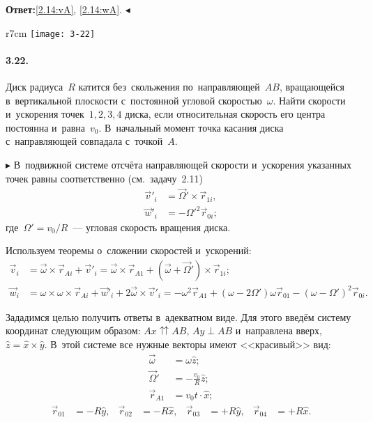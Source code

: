 \documentclass{weekly}
\begin{document}
\textbf{Ответ:}\quad \eqref{2.14:vA}, \eqref{2.14:wA}.
\hfill $\blacktriangleleft$


\begin{wrapfigure}[6]{r}{7cm}\vspace{-5.5mm}
    \texttt{[image: 3-22]}
\end{wrapfigure}
\paragraph{3.22.} Диск радиуса~$R$ катится без~скольжения
по~направляющей~$AB$, вращающейся в~вертикальной плоскости
с~постоянной угловой скоростью~$\omega$. Найти скорости
и~ускорения точек~$1, 2, 3, 4$ диска, если относительная
скорость его центра постоянна и~равна~$v_0$.
В~начальный момент точка касания диска с~направляющей
совпадала с~точкой~$A$.

$\blacktriangleright$ В~подвижной системе отсчёта направляющей
скорости и~ускорения указанных точек
равны соответственно (см.~задачу~2.11)
\begin{align}
    \vec v'_i &= \vec\Omega' \times \vec r_{1i}, \\
    \vec w'_i &= -\Omega'^2 \vec r_{0i};
\end{align}
где~$\Omega' = v_0/R$~--- угловая скорость вращения диска.

Используем теоремы о~сложении скоростей и~ускорений:
\begin{align}
    \vec v_i &= \vec\omega \times \vec r_{Ai} + \vec v'_i
        = \vec\omega \times \vec r_{A1} +
            \left(\vec\omega + \vec\Omega'\right) \times \vec r_{1i};
\\
    \vec w_i &= \omega \times \omega \times \vec r_{Ai} + \vec w'_i +
            2\vec\omega \times \vec v'_i
        = -\omega^2 \vec r_{A1} +
            \left(\omega - 2\Omega'\right)\omega \vec r_{01} -
            \left(\omega - \Omega'\right)^2 \vec r_{0i}.
\end{align}

Зададимся целью получить ответы в~адекватном виде.
Для этого введём систему координат следующим образом:
$Ax \upuparrows AB$, $Ay \perp AB$ и~направлена вверх,
$\hat z = \hat x \times \hat y$.
В~этой системе все нужные векторы имеют <<красивый>> вид:
\begin{align}
    \vec\omega &= \omega \hat z; \\
    \vec\Omega' &= -\frac{v_0}{R} \hat z; \\
    \vec r_{A1} &= v_0 t \cdot \hat x;
\end{align}\vspace{-6ex}
\begin{align}
    \vec r_{01} &= -R \hat y, &
    \vec r_{02} &= -R \hat x, &
    \vec r_{03} &= +R \hat y, &
    \vec r_{04} &= +R \hat x.
\end{align}
\end{document}
